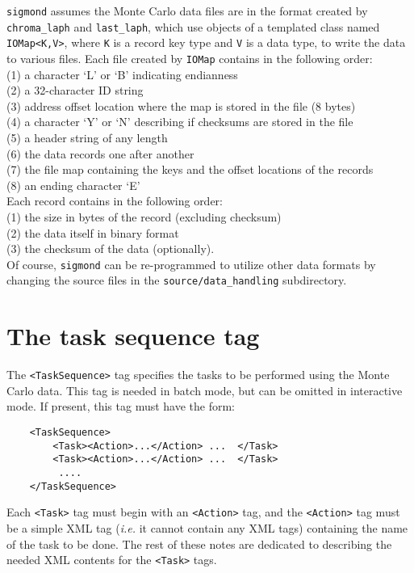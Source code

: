 \documentclass[12pt]{article}
\newcommand{\vb}{\texttt}
\begin{document}
\vb{sigmond} assumes the Monte Carlo data files are in the format
created by \vb{chroma\_laph} and \vb{last\_laph}, which use objects
of a templated class named \vb{IOMap<K,V>}, where \vb{K} is a record 
key type and \vb{V} is a data type, to write the data to various
files.  Each file created by \vb{IOMap} contains in the following order:\\
\hspace*{20pt}(1) a character `L' or `B' indicating endianness\\
\hspace*{20pt}(2) a 32-character ID string\\
\hspace*{20pt}(3) address offset location where the map is stored in the file (8 bytes) \\
\hspace*{20pt}(4) a character `Y' or `N' describing if checksums are stored in the file \\
\hspace*{20pt}(5) a header string of any length\\
\hspace*{20pt}(6) the data records one after another \\
\hspace*{20pt}(7) the file map containing the keys and the offset locations of the records\\
\hspace*{20pt}(8) an ending character `E'\\
Each record contains in the following order:\\
\hspace*{20pt}(1) the size in bytes of the record (excluding checksum)\\
\hspace*{20pt}(2) the data itself in binary format\\
\hspace*{20pt}(3) the checksum of the data (optionally).\\
Of course, \vb{sigmond} can be re-programmed to utilize other data formats
by changing the source files in the \vb{source/data\_handling} subdirectory.


\section{The task sequence tag}

The \vb{<TaskSequence>} tag specifies the tasks to be performed using the 
Monte Carlo data.  This tag is needed in batch mode, but 
can be omitted in interactive mode.  If present, this tag must have the form:
\begin{verbatim}
    <TaskSequence>
        <Task><Action>...</Action> ...  </Task>
        <Task><Action>...</Action> ...  </Task>
         .... 
    </TaskSequence>
\end{verbatim}
Each \vb{<Task>} tag must begin with an \vb{<Action>} tag, and
the \vb{<Action>} tag must be a simple XML tag (\textit{i.e.} it cannot contain
any XML tags) containing the name of the task to be done.
The rest of these notes are dedicated to describing the needed XML contents
for the \vb{<Task>} tags.
\end{document}
